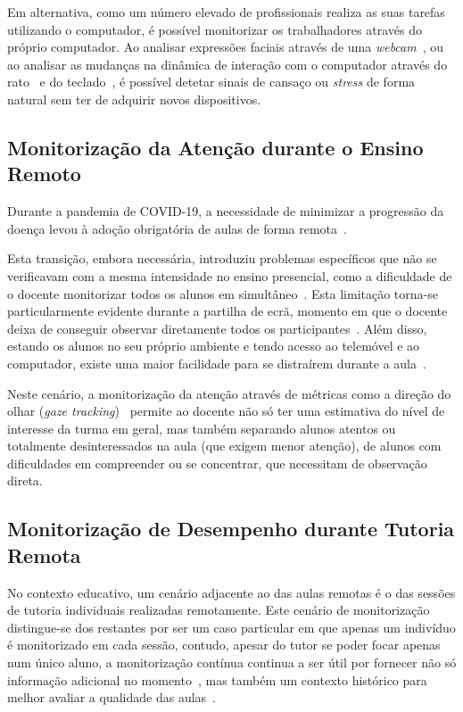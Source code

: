 Em alternativa, como um número elevado de profissionais realiza as suas tarefas utilizando o computador, é possível monitorizar os trabalhadores através do próprio computador.
Ao analisar expressões faciais através de uma \textit{webcam}~\cite{facial_hrv_study}, ou ao analisar as mudanças na dinâmica de interação com o computador através do rato~\cite{Zimmermann2003,Kafkov2024} e do teclado~\cite{Zimmermann2003,Kafkov2024,keyboard_speed_study,keyboard_correction_study}, é possível detetar sinais de cansaço ou \textit{stress} de forma natural sem ter de adquirir novos dispositivos.

\subsection{Monitorização da Atenção durante o Ensino Remoto}\label{sec:scenario_school}

Durante a pandemia de COVID-19, a necessidade de minimizar a progressão da doença levou à adoção obrigatória de aulas de forma remota~\cite{online_classes_sharma}.

Esta transição, embora necessária, introduziu problemas específicos que não se verificavam com a mesma intensidade no ensino presencial, como a dificuldade de o docente monitorizar todos os alunos em simultâneo~\cite{online_classes_sharma}.
Esta limitação torna-se particularmente evidente durante a partilha de ecrã, momento em que o docente deixa de conseguir observar diretamente todos os participantes~\cite{online_classes_sharma}. Além disso, estando os alunos no seu próprio ambiente e tendo acesso ao telemóvel e ao computador, existe uma maior facilidade para se distraírem durante a aula~\cite{online_classes_sharma}.

Neste cenário, a monitorização da atenção através de métricas como a direção do olhar (\textit{gaze tracking})~\cite{online_classes_sharma} permite ao docente não só ter uma estimativa do nível de interesse da turma em geral, mas também separando alunos atentos ou totalmente desinteressados na aula (que exigem menor atenção), de alunos com dificuldades em compreender ou se concentrar, que necessitam de observação direta.

\subsection{Monitorização de Desempenho durante Tutoria Remota}

No contexto educativo, um cenário adjacente ao das aulas remotas é o das sessões de tutoria individuais realizadas remotamente.
Este cenário de monitorização distingue-se dos restantes por ser um caso particular em que apenas um indivíduo é monitorizado em cada sessão, contudo, apesar do tutor se poder focar apenas num único aluno, a monitorização contínua continua a ser útil por fornecer não só informação adicional no momento~\cite{Yang2023}, mas também um contexto histórico para melhor avaliar a qualidade das aulas~\cite{Schwendimann2017}.

